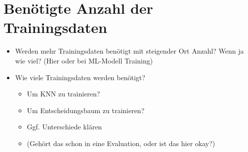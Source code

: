 \section{Benötigte Anzahl der Trainingsdaten}
\begin{itemize}
    \item Werden mehr Trainingsdaten benötigt mit steigender Ort Anzahl? Wenn ja wie viel? (Hier oder bei ML-Modell Training)
    \item Wie viele Trainingsdaten werden benötigt?
    \begin{itemize}
        \item Um KNN zu trainieren?
        \item Um Entscheidungsbaum zu trainieren?
        \item Ggf. Unterschiede klären
        \item (Gehört das schon in eine Evaluation, oder ist das hier okay?)
    \end{itemize}
\end{itemize}




